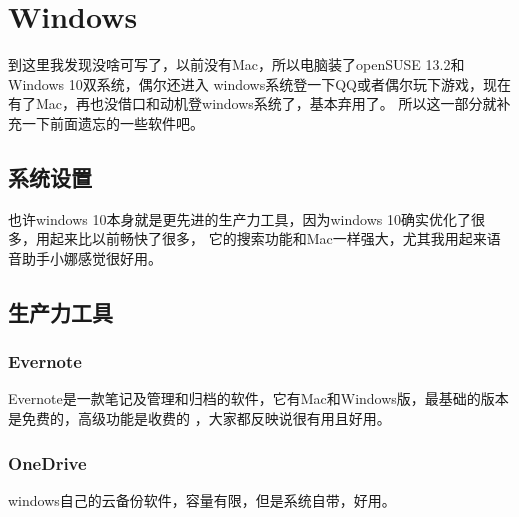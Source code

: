 \documentclass[11pt,fleqn]{book} %
\begin{document}
\chapter{Windows \texorpdfstring{\faWindows}{world}}
到这里我发现没啥可写了，以前没有Mac，所以电脑装了openSUSE 13.2和Windows 10双系统，偶尔还进入
windows系统登一下QQ或者偶尔玩下游戏，现在有了Mac，再也没借口和动机登windows系统了，基本弃用了。
所以这一部分就补充一下前面遗忘的一些软件吧。
\section{系统设置}
也许windows 10本身就是更先进的生产力工具，因为windows 10确实优化了很多，用起来比以前畅快了很多，
它的搜索功能和Mac一样强大，尤其我用起来语音助手小娜感觉很好用。
\section{生产力工具}
\subsection{Evernote}
Evernote是一款笔记及管理和归档的软件，它有Mac和Windows版，最基础的版本是免费的，高级功能是收费的
，大家都反映说很有用且好用。
\subsection{OneDrive}
windows自己的云备份软件，容量有限，但是系统自带，好用。
\end{document}
